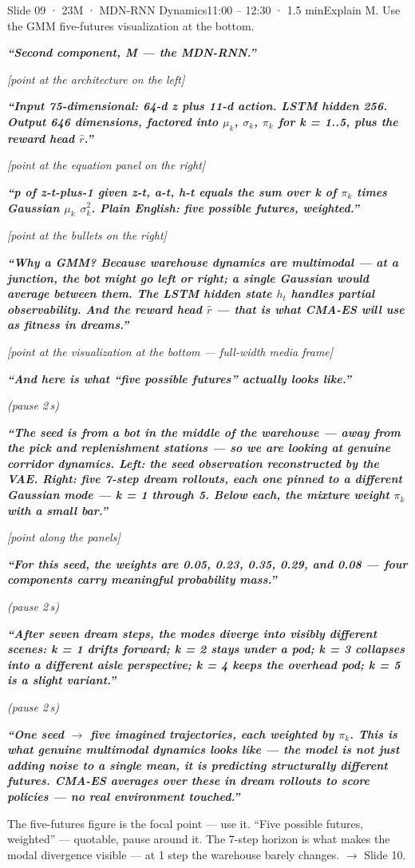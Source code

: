 \documentclass[11pt,a4paper]{article}
\newcommand{\say}[1]{%
    \par\vspace{0.3em}%
    \begingroup
    \leftskip=12pt
    \rightskip=8pt
    \color{thStrong}%
    \itshape\textbf{“#1”}%
    \par
    \endgroup
    \vspace{0.2em}
}
\newcommand{\beat}[1][2]{%
    \par\textcolor{thMuted}{\small\textit{(pause #1\,s)}}\par
    \vspace{0.2em}
}
\newcommand{\stage}[1]{%
    \par\textcolor{thMuted}{\small\textit{[#1]}}\par
    \vspace{0.2em}
}
\newcommand{\emphw}[1]{\textbf{\textcolor{thAmber}{#1}}}
\begin{document}
\begin{slide}{Slide 09 · 23}{M · MDN-RNN Dynamics}{11:00 – 12:30 · 1.5 min}{Explain M. Use the GMM five-futures visualization at the bottom.}
\say{Second component, M — the MDN-RNN.}

\stage{point at the architecture on the left}

\say{Input 75-dimensional: 64-d z plus 11-d action. LSTM hidden 256. Output 646 dimensions, factored into $\mu_k$, $\sigma_k$, $\pi_k$ for k = 1..5, plus the \emphw{reward head} $\hat{r}$.}

\stage{point at the equation panel on the right}

\say{\textbf{p of z-t-plus-1 given z-t, a-t, h-t equals the sum over k of $\pi_k$ times Gaussian $\mu_k$ $\sigma_k^2$.} Plain English: \emphw{five possible futures, weighted}.}

\stage{point at the bullets on the right}

\say{Why a GMM? Because warehouse dynamics are \textbf{multimodal} — at a junction, the bot might go left or right; a single Gaussian would average between them. The LSTM hidden state $h_t$ handles partial observability. And the \emphw{reward head} $\hat{r}$ — that is what CMA-ES will use as fitness in dreams.}

\stage{point at the visualization at the bottom — full-width media frame}

\say{And here is what ``five possible futures'' actually looks like.}
\beat
\say{The seed is from a bot in the \emphw{middle of the warehouse — away from the pick and replenishment stations} — so we are looking at genuine corridor dynamics. Left: the seed observation reconstructed by the VAE. Right: \textbf{five 7-step dream rollouts, each one pinned to a different Gaussian mode} — k = 1 through 5. Below each, the mixture weight $\pi_k$ with a small bar.}

\stage{point along the panels}

\say{For this seed, the weights are \textbf{0.05, 0.23, 0.35, 0.29, and 0.08} — four components carry meaningful probability mass.}
\beat
\say{After seven dream steps, the modes diverge into \emphw{visibly different scenes}: k = 1 drifts forward; k = 2 stays under a pod; \textbf{k = 3 collapses into a different aisle perspective}; k = 4 keeps the overhead pod; k = 5 is a slight variant.}
\beat
\say{\emphw{One seed} $\rightarrow$ five imagined trajectories, each weighted by $\pi_k$. This is what genuine multimodal dynamics looks like — the model is not just adding noise to a single mean, it is predicting \textbf{structurally different futures}. CMA-ES averages over these in dream rollouts to score policies — \textbf{no real environment touched}.}

\begin{stagebox}
The five-futures figure is the focal point — use it. ``Five possible futures, weighted'' — quotable, pause around it. The 7-step horizon is what makes the modal divergence visible — at 1 step the warehouse barely changes. $\rightarrow$ Slide 10.
\end{stagebox}
\end{slide}
\end{document}

